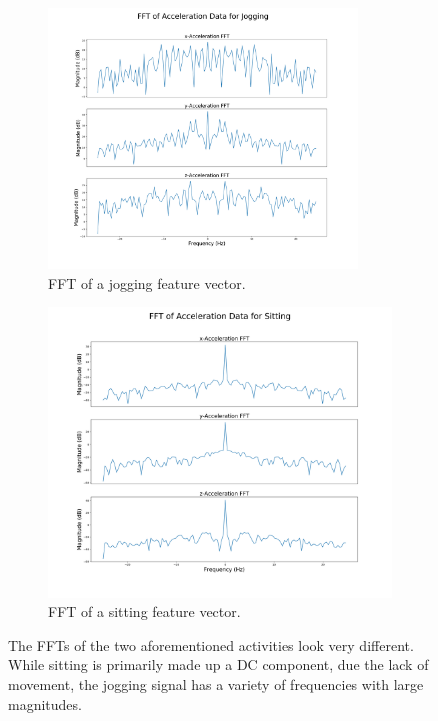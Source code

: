 \begin{figure}[H]
\begin{subfigure}{.5\textwidth}
  \includegraphics[width = 0.9\textwidth]{images/comparisons/JoggingFFT.png}
    \caption{FFT of a jogging feature vector.}
     \label{fig:jogFFT}
\end{subfigure}
\begin{subfigure}{.5\textwidth}
    \includegraphics[width = 0.9 \textwidth]{images/comparisons/SittingFFT.png}
    \caption{FFT of a sitting feature vector.}
    \label{fig:sitFFT}
\end{subfigure}
\caption{The FFTs of the two aforementioned activities look very different. While sitting is primarily made up a DC component, due the lack of movement, the jogging signal has a variety of frequencies with large magnitudes.}
\label{fig:fft_comp}
\end{figure}


